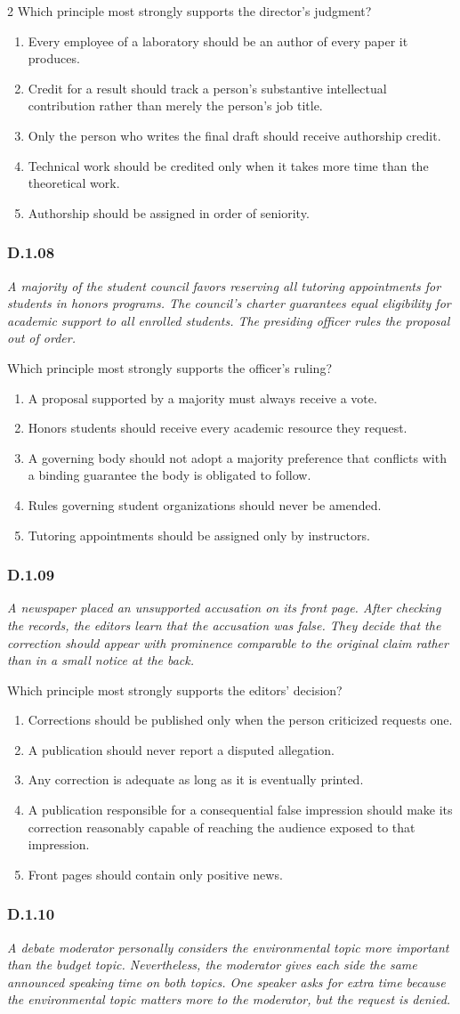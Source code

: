 \documentclass[10pt]{extarticle}
\newcommand{\choice}[1]{\item #1}
\newcommand{\bankitem}[1]{\subsubsection*{#1}}
\begin{document}
\begin{multicols}{2}
Which principle most strongly supports the director's judgment?
\begin{enumerate}[label=(\alph*)]
  \choice{Every employee of a laboratory should be an author of every paper it produces.}
  \choice{Credit for a result should track a person's substantive intellectual contribution rather than merely the person's job title.}
  \choice{Only the person who writes the final draft should receive authorship credit.}
  \choice{Technical work should be credited only when it takes more time than the theoretical work.}
  \choice{Authorship should be assigned in order of seniority.}
\end{enumerate}
\bankitem{D.1.08}
\emph{A majority of the student council favors reserving all tutoring appointments for students in honors programs. The council's charter guarantees equal eligibility for academic support to all enrolled students. The presiding officer rules the proposal out of order.}

Which principle most strongly supports the officer's ruling?
\begin{enumerate}[label=(\alph*)]
  \choice{A proposal supported by a majority must always receive a vote.}
  \choice{Honors students should receive every academic resource they request.}
  \choice{A governing body should not adopt a majority preference that conflicts with a binding guarantee the body is obligated to follow.}
  \choice{Rules governing student organizations should never be amended.}
  \choice{Tutoring appointments should be assigned only by instructors.}
\end{enumerate}
\bankitem{D.1.09}
\emph{A newspaper placed an unsupported accusation on its front page. After checking the records, the editors learn that the accusation was false. They decide that the correction should appear with prominence comparable to the original claim rather than in a small notice at the back.}

Which principle most strongly supports the editors' decision?
\begin{enumerate}[label=(\alph*)]
  \choice{Corrections should be published only when the person criticized requests one.}
  \choice{A publication should never report a disputed allegation.}
  \choice{Any correction is adequate as long as it is eventually printed.}
  \choice{A publication responsible for a consequential false impression should make its correction reasonably capable of reaching the audience exposed to that impression.}
  \choice{Front pages should contain only positive news.}
\end{enumerate}
\bankitem{D.1.10}
\emph{A debate moderator personally considers the environmental topic more important than the budget topic. Nevertheless, the moderator gives each side the same announced speaking time on both topics. One speaker asks for extra time because the environmental topic matters more to the moderator, but the request is denied.}


\end{multicols}
\end{document}
